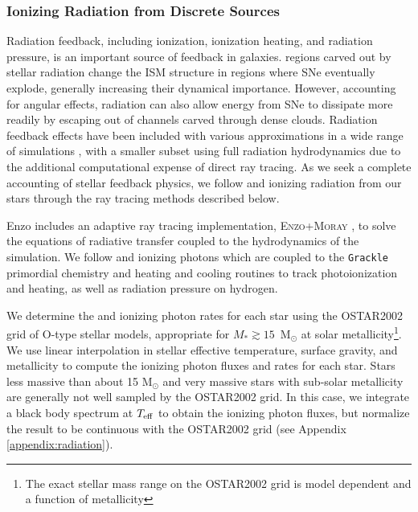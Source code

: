 \documentclass[twocolumn]{aastex61}
\begin{document}
\subsubsection{Ionizing Radiation from Discrete Sources}
\label{sec:ionizing radiation}
Radiation feedback, including ionization, ionization heating, and radiation pressure, is an important source of feedback in galaxies.  regions carved out by stellar radiation change the ISM structure in regions where SNe eventually explode, generally increasing their dynamical importance. However, accounting for angular effects, radiation can also allow energy from SNe to dissipate more readily by escaping out of channels carved through dense clouds. Radiation feedback effects have been included with various approximations in a wide range of simulations \citep[e.g.][]{OppenheimerDave2006, Krumholz2007, HopkinsQuataertMurray2012, Agertz2013, Renaud2013, Stinson2013, Roskar2014, Ceverino2014, FIRE, AgertzKravtsov2015, Forbes2016, Hu2016, Hu2017, FIRE2}, with a smaller subset using full radiation hydrodynamics \citep{WiseAbel2012,Wise2012a,Wise2014,Kim2013a, Kim2013b,Pawlik2013,Rosdahl2015,Aubert2015,Ocvirk2016,BaczynskiGloverKlessen2015,Pawlik2017} due to the additional computational expense of direct ray tracing. As we seek a complete accounting of stellar feedback physics, we follow  and  ionizing radiation from our stars through the ray tracing methods described below. 

Enzo includes an adaptive ray tracing implementation, \textsc{Enzo+Moray} \citep{WiseAbel2011}, to solve the equations of radiative transfer coupled to the hydrodynamics of the simulation. We follow  and  ionizing photons which are coupled to the \texttt{Grackle} primordial chemistry and heating and cooling routines to track photoionization and heating, as well as radiation pressure on hydrogen. 

We determine the  and  ionizing photon rates for each star using the OSTAR2002 \citep{Lanz2003} grid of O-type stellar models, appropriate for $M_{*} \gtrsim 15$~M$_{\odot}$ at solar metallicity\footnote{The exact stellar mass range on the OSTAR2002 grid is model dependent and a function of metallicity}. We use linear interpolation in stellar effective temperature, surface gravity, and metallicity to compute the ionizing photon fluxes and rates for each star. Stars less massive than about 15 M$_{\odot}$ and very massive stars with sub-solar metallicity are generally not well sampled by the OSTAR2002 grid. In this case, we integrate a black body spectrum at $T_{\rm eff}$ to obtain the ionizing photon fluxes, but normalize the result to be continuous with the OSTAR2002 grid (see Appendix \ref{appendix:radiation}).
\end{document}
